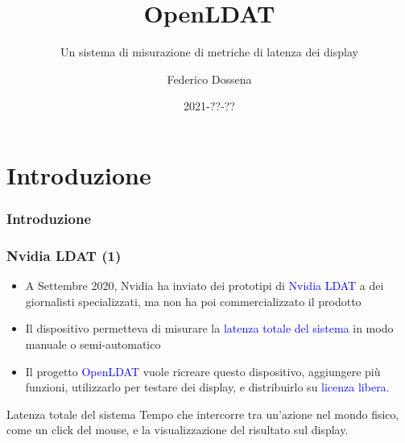 \documentclass{beamer}
\title{OpenLDAT}
\subtitle{Un sistema di misurazione di metriche di latenza dei display}
\author{Federico Dossena}
\institute{Università degli Studi di Milano}
\date{2021-??-??}
\begin{document}
	
\begin{frame}
	\titlepage
\end{frame}

\section{Introduzione}
\begin{frame}
	\frametitle{Introduzione}
	\lipsum[1]
\end{frame}
\begin{frame}
\frametitle{Nvidia LDAT (1)}
\begin{itemize}
	\item A Settembre 2020, Nvidia ha inviato dei prototipi di \textcolor{blue}{Nvidia LDAT} a dei giornalisti specializzati, ma non ha poi commercializzato il prodotto
	\item Il dispositivo permetteva di misurare la \textcolor{blue}{latenza totale del sistema} in modo manuale o semi-automatico
	\item Il progetto \textcolor{blue}{OpenLDAT} vuole ricreare questo dispositivo, aggiungere più funzioni, utilizzarlo per testare dei display, e distribuirlo su \textcolor{blue}{licenza libera}.
\end{itemize}
\begin{block}{Latenza totale del sistema}
	Tempo che intercorre tra un'azione nel mondo fisico, come un click del mouse, e la visualizzazione del risultato sul display.
\end{block}
\end{frame}
\end{document}
